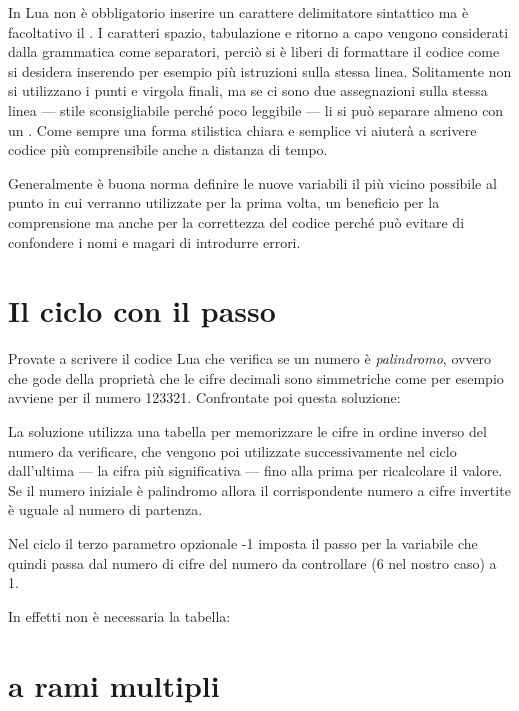 In Lua non è obbligatorio inserire un carattere delimitatore sintattico ma è
facoltativo il \key{;}. I caratteri spazio, tabulazione e ritorno a capo vengono
considerati dalla grammatica come separatori, perciò si è liberi di formattare
il codice come si desidera inserendo per esempio più istruzioni sulla stessa
linea. Solitamente non si utilizzano i punti e virgola finali, ma se ci sono due
assegnazioni sulla stessa linea --- stile sconsigliabile perché poco leggibile
--- li si può separare almeno con un \key{;}. Come sempre una forma stilistica
chiara e semplice vi aiuterà a scrivere codice più comprensibile anche a
distanza di tempo.

Generalmente è buona norma definire le nuove variabili il più vicino possibile
al punto in cui verranno utilizzate per la prima volta, un beneficio per la
comprensione ma anche per la correttezza del codice perché può evitare di
confondere i nomi e magari di introdurre errori.


\section{Il ciclo  con il passo}

Provate a scrivere il codice Lua che verifica se un numero è \emph{palindromo},
ovvero che gode della proprietà che le cifre decimali sono simmetriche come per
esempio avviene per il numero 123321. Confrontate poi questa soluzione:

La soluzione utilizza una tabella per memorizzare le cifre in ordine inverso del
numero da verificare, che vengono poi utilizzate successivamente nel ciclo
 dall'ultima --- la cifra più significativa --- fino alla
prima per ricalcolare il valore. Se il numero iniziale è palindromo allora il
corrispondente numero a cifre invertite è uguale al numero di partenza.

Nel ciclo  il terzo parametro opzionale -1 imposta il passo per la
variabile  che quindi passa dal numero di cifre del numero da
controllare (6 nel nostro caso) a 1.

In effetti non è necessaria la tabella:


\section{ a rami multipli}

